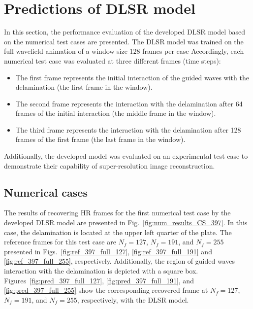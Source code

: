 \section{Predictions of DLSR model}
\label{sec54}
In this section, the performance evaluation of the developed DLSR model based on the numerical test cases are presented.
The DLSR model was trained on the full wavefield animation of a window size $128$ frames per case
Accordingly, each numerical test case was evaluated at three different frames (time steps):
\begin{itemize}
	\item The first frame represents the initial interaction of the guided waves with the delamination (the first frame in the window).
	\item The second frame represents the interaction with the delamination after 64 frames of the initial interaction (the middle frame in the window).
	\item The third frame represents the interaction with the delamination after 128 frames of the first frame (the last frame in the window).
\end{itemize}

Additionally, the developed model was evaluated on an experimental test case to demonstrate their capability of super-resolution image reconstruction.

\subsection{Numerical cases}
\label{sec541}
The results of recovering HR frames for the first numerical test case by the developed DLSR model are presented in Fig.~\ref{fig:num_results_CS_397}.
In this case, the delamination is located at the upper left quarter of the plate.
The reference frames for this test case are $N_f=127$, $N_f=191$, and $N_f=255$ presented in Figs.~\ref{fig:ref_397_full_127}, \ref{fig:ref_397_full_191} and \ref{fig:ref_397_full_255}, respectively.
Additionally, the region of guided waves interaction with the delamination is depicted with a square box.
Figures~\ref{fig:pred_397_full_127}, \ref{fig:pred_397_full_191}, and \ref{fig:pred_397_full_255} show the corresponding recovered frame at $N_f=127$, $N_f=191$, and $N_f=255$, respectively, with the DLSR model.

